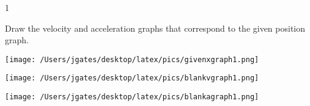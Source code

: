 
\AddToShipoutPicture*{\BackgroundPic}

\addtocounter {ProbNum} {1}

 
{\bf \Large{}} Draw the velocity and acceleration graphs that correspond to the given position graph.

\begin{center}
\texttt{[image: /Users/jgates/desktop/latex/pics/givenxgraph1.png]}
\end{center}

\begin{center}
\texttt{[image: /Users/jgates/desktop/latex/pics/blankvgraph1.png]}
\end{center}

\begin{center}
\texttt{[image: /Users/jgates/desktop/latex/pics/blankagraph1.png]}
\end{center}


\vfill
\newpage
